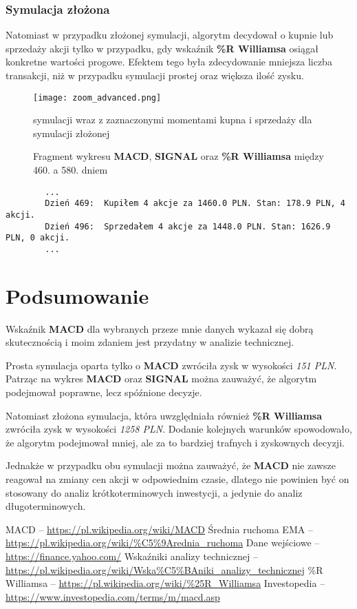 \documentclass{article}
\begin{document}
    \subsubsection{Symulacja złożona}
    Natomiast w przypadku złożonej symulacji, algorytm 
    decydował o kupnie lub sprzedaży akcji tylko w przypadku, gdy wskaźnik \textbf{\%R Williamsa} 
    osiągał konkretne wartości progowe. Efektem tego była zdecydowanie mniejsza liczba transakcji, 
    niż w przypadku symulacji prostej oraz większa ilość zysku.


    \begin{figure}[H]
        \texttt{[image: zoom\_advanced.png]}
        \centering
        \caption{Fragment wykresu \textbf{MACD}, \textbf{SIGNAL} oraz \textbf{\%R Williamsa} między 460. a 580. dniem}{symulacji wraz z zaznaczonymi momentami kupna i sprzedaży
        dla symulacji złożonej}
    \end{figure}

    \begin{verbatim}
        ...
        Dzień 469:  Kupiłem 4 akcje za 1460.0 PLN. Stan: 178.9 PLN, 4 akcji.
        Dzień 496:  Sprzedałem 4 akcje za 1448.0 PLN. Stan: 1626.9 PLN, 0 akcji.
        ...
    \end{verbatim}

    \section{Podsumowanie}
    Wskaźnik \textbf{MACD} dla wybranych przeze mnie danych wykazał się dobrą skutecznością i moim
    zdaniem jest przydatny w analizie technicznej.

    Prosta symulacja oparta tylko o \textbf{MACD} zwróciła zysk w wysokości \textit{151 PLN}.
    Patrząc na wykres \textbf{MACD} oraz \textbf{SIGNAL} można zauważyć, że algorytm
    podejmował poprawne, lecz spóźnione decyzje.

    Natomiast złożona symulacja, która uwzględniała również \textbf{\%R Williamsa} 
    zwróciła zysk w wysokości \textit{1258 PLN}. Dodanie kolejnych warunków spowodowało, że
    algorytm podejmował mniej, ale za to bardziej trafnych i zyskownych decyzji.

    Jednakże w przypadku obu symulacji można zauważyć, że \textbf{MACD} nie zawsze
    reagował na zmiany cen akcji w odpowiednim czasie, dlatego nie powinien być on
    stosowany do analiz krótkoterminowych inwestycji, a jedynie do analiz długoterminowych.

    \renewcommand{\refname}{Źródła}
    \begin{thebibliography}{100}
      MACD -- \url{https://pl.wikipedia.org/wiki/MACD}
      Średnia ruchoma EMA -- \url{https://pl.wikipedia.org/wiki/%C5%9Arednia_ruchoma}
     Dane wejściowe -- \url{https://finance.yahoo.com/}
     Wskaźniki analizy technicznej -- \url{https://pl.wikipedia.org/wiki/Wska%C5%BAniki_analizy_technicznej}
     \%R Williamsa -- \url{https://pl.wikipedia.org/wiki/%25R_Williamsa}
    \bibitem{} Investopedia -- \url{https://www.investopedia.com/terms/m/macd.asp}
    \end{thebibliography}
\end{document}
